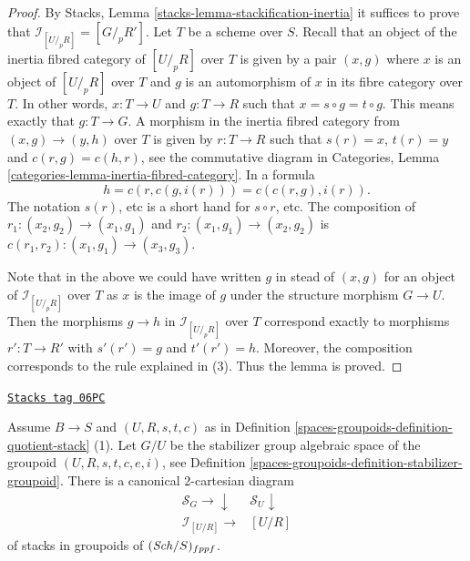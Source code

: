 \begin{proof}
By
Stacks, Lemma \ref{stacks-lemma-stackification-inertia}
it suffices to prove that $\mathcal{I}_{[U/_{\!p}R]} = [G/_{\!p} R']$.
Let $T$ be a scheme over $S$. Recall that an object of the inertia fibred
category of $[U/_{\!p}R]$ over $T$ is given by a pair
$(x, g)$ where $x$ is an object of $[U/_{\!\!p}R]$ over $T$
and $g$ is an automorphism of $x$ in its fibre category over $T$.
In other words, $x : T \to U$ and $g : T \to R$ such that
$x = s \circ g = t \circ g$. This means exactly that
$g : T \to G$. A morphism in the inertia fibred category
from $(x, g) \to (y, h)$ over $T$ is given by
$r : T \to R$ such that $s(r) = x$, $t(r) = y$
and $c(r, g) = c(h, r)$, see the commutative diagram in
Categories, Lemma \ref{categories-lemma-inertia-fibred-category}.
In a formula
$$
h = c(r, c(g, i(r))) = c(c(r, g), i(r)).
$$
The notation $s(r)$, etc is a short hand for $s \circ r$, etc.
The composition of $r_1 : (x_2, g_2) \to (x_1, g_1)$
and $r_2 : (x_1, g_1) \to (x_2, g_2)$ is
$c(r_1, r_2) : (x_1, g_1) \to (x_3, g_3)$.

\medskip\noindent
Note that in the above we could have written $g$ in stead of $(x, g)$
for an object of $\mathcal{I}_{[U/_{\!p}R]}$ over $T$ as $x$ is the
image of $g$ under the structure morphism $G \to U$. Then the morphisms
$g \to h$ in $\mathcal{I}_{[U/_{\!p}R]}$ over $T$ correspond exactly
to morphisms $r' : T \to R'$ with $s'(r') = g$ and $t'(r') = h$.
Moreover, the composition corresponds to the rule explained in (3).
Thus the lemma is proved.
\end{proof}

\begin{lemma}
\label{spaces-groupoids-lemma-2-cartesian-inertia}
\href{https://stacks.math.columbia.edu/tag/06PC}{\texttt{Stacks tag 06PC}}

Assume $B \to S$ and $(U, R, s, t, c)$ as in
Definition \ref{spaces-groupoids-definition-quotient-stack} (1).
Let $G/U$ be the stabilizer group algebraic space of the groupoid
$(U, R, s, t, c, e, i)$, see
Definition \ref{spaces-groupoids-definition-stabilizer-groupoid}.
There is a canonical $2$-cartesian diagram
$$
\begin{array}{cc}\mathcal{S}_G \longrightarrow\downarrow & \mathcal{S}_U \downarrow \\ \mathcal{I}_{[U/R]} \longrightarrow & [U/R]\end{array}
$$
of stacks in groupoids of $(\mathit{Sch}/S)_{fppf}$.
\end{lemma}

